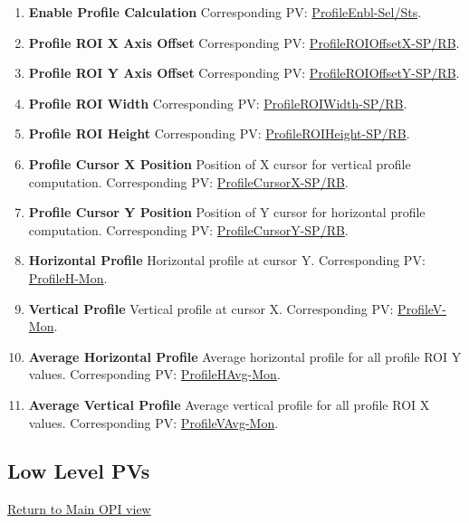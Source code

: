 \documentclass[openany]{article}
\begin{document}
        \begin{enumerate}
            \item \textbf{Enable Profile Calculation} Corresponding PV: \hyperlink{pv:profile-enbl}{ProfileEnbl-Sel/Sts}.
            \item \textbf{Profile ROI X Axis Offset} Corresponding PV: \hyperlink{pv:profile-roi-offset-x}{ProfileROIOffsetX-SP/RB}.
            \item \textbf{Profile ROI Y Axis Offset} Corresponding PV: \hyperlink{pv:profile-roi-offset-y}{ProfileROIOffsetY-SP/RB}.
            \item \textbf{Profile ROI Width} Corresponding PV: \hyperlink{pv:profile-roi-width}{ProfileROIWidth-SP/RB}.
            \item \textbf{Profile ROI Height} Corresponding PV: \hyperlink{pv:profile-roi-height}{ProfileROIHeight-SP/RB}.
            \item \textbf{Profile Cursor X Position} Position of X cursor for vertical profile computation. Corresponding PV: \hyperlink{pv:profile-cursor-x}{ProfileCursorX-SP/RB}.
            \item \textbf{Profile Cursor Y Position} Position of Y cursor for horizontal profile computation. Corresponding PV: \hyperlink{pv:profile-cursor-y}{ProfileCursorY-SP/RB}.
            \item \textbf{Horizontal Profile} Horizontal profile at cursor Y. Corresponding PV: \hyperlink{pv:profile-h}{ProfileH-Mon}.
            \item \textbf{Vertical Profile} Vertical profile at cursor X. Corresponding PV: \hyperlink{pv:profile-v}{ProfileV-Mon}.
            \item \textbf{Average Horizontal Profile} Average horizontal profile for all profile ROI Y values. Corresponding PV: \hyperlink{pv:profile-h-avg}{ProfileHAvg-Mon}.
            \item \textbf{Average Vertical Profile} Average vertical profile for all profile ROI X values. Corresponding PV: \hyperlink{pv:profile-v-avg}{ProfileVAvg-Mon}.
        \end{enumerate}

    \subsection{Low Level PVs}\label{sec:low-level-pvs}

        \hyperref[fig:opi-main]{Return to Main OPI view}
\end{document}
